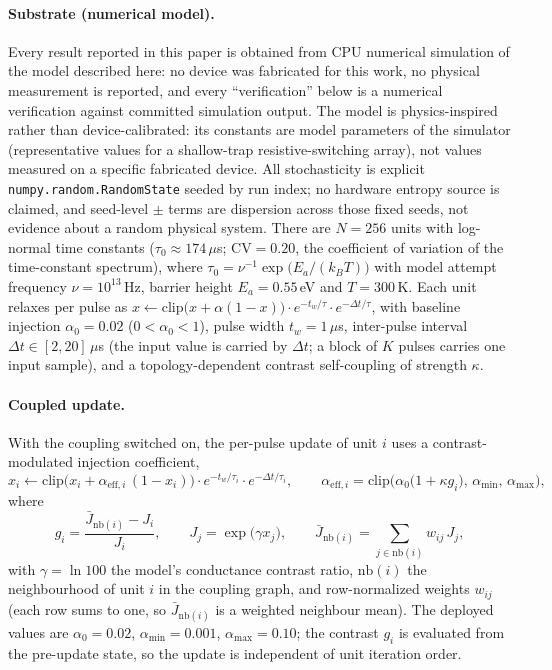 \documentclass[preprint,12pt]{elsarticle}
\begin{document}
\paragraph{Substrate (numerical model).} Every result reported in this paper
is obtained from CPU numerical simulation of the model described here: no
device was fabricated for this work, no physical measurement is reported, and
every ``verification'' below is a numerical verification against committed
simulation output. The model is physics-inspired rather than device-calibrated:
its constants are model parameters of the simulator (representative
values for a shallow-trap resistive-switching array), not values measured on
a specific fabricated device. All stochasticity is explicit
\texttt{numpy.random.RandomState} seeded by run index; no hardware entropy
source is claimed, and seed-level $\pm$ terms are dispersion across those
fixed seeds, not evidence about a random physical system. There are $N=256$ units with log-normal time
constants ($\tau_0\approx174\,\mu$s; CV$=0.20$, the coefficient of variation
of the time-constant spectrum), where
$\tau_0=\nu^{-1}\exp\!\big(E_a/(k_BT)\big)$ with model attempt frequency
$\nu=10^{13}\,$Hz, barrier height $E_a=0.55\,$eV and $T=300\,$K. Each unit
relaxes per pulse as
$x \leftarrow \mathrm{clip}\big(x+\alpha(1-x)\big)\cdot e^{-t_w/\tau}
\cdot e^{-\Delta t/\tau}$, with baseline injection $\alpha_0=0.02$
($0<\alpha_0<1$), pulse width $t_w=1\,\mu$s, inter-pulse interval
$\Delta t\in[2,20]\,\mu$s (the input value is carried by $\Delta t$; a block
of $K$ pulses carries one input sample), and a topology-dependent contrast
self-coupling of strength $\kappa$.

\paragraph{Coupled update.} With the coupling switched on, the per-pulse
update of unit $i$ uses a contrast-modulated injection coefficient,
\begin{equation}
\label{eq:coupled}
x_i \leftarrow \mathrm{clip}\Big(x_i+\alpha_{\mathrm{eff},i}\,(1-x_i)\Big)
\cdot e^{-t_w/\tau_i}\cdot e^{-\Delta t/\tau_i},
\qquad
\alpha_{\mathrm{eff},i}=\mathrm{clip}\Big(\alpha_0\big(1+\kappa g_i\big),\,
\alpha_{\min},\,\alpha_{\max}\Big),
\end{equation}
where
\begin{equation}
\label{eq:contrast}
g_i=\frac{\bar J_{\mathrm{nb}(i)}-J_i}{J_i},
\qquad
J_j=\exp\!\big(\gamma x_j\big),\qquad
\bar J_{\mathrm{nb}(i)}=\sum_{j\in\mathrm{nb}(i)}w_{ij}\,J_j ,
\end{equation}
with $\gamma=\ln 100$ the model's conductance contrast ratio,
$\mathrm{nb}(i)$ the neighbourhood of unit $i$ in the coupling graph, and
row-normalized weights $w_{ij}$ (each row sums to one, so
$\bar J_{\mathrm{nb}(i)}$ is a weighted neighbour mean). The deployed
values are $\alpha_0=0.02$, $\alpha_{\min}=0.001$, $\alpha_{\max}=0.10$; the
contrast $g_i$ is evaluated from the pre-update state, so the update is
independent of unit iteration order.
\end{document}
